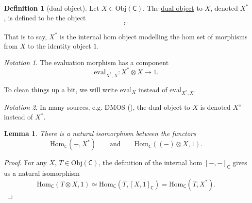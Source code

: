 \documentclass[a4paper]{report}
\newcommand{\defn}[1]{\ul{#1}}
\newcommand{\Obj}{\mathrm{Obj}}
\newcommand{\Hom}{\mathrm{Hom}}
\newcommand{\ev}{\mathrm{eval}}
\theoremstyle{definition}
\newtheorem{definition}{Definition}[section]
\theoremstyle{plain}
\newtheorem{lemma}{Lemma}[section]
\theoremstyle{remark}
\newtheorem{notation}{Notation}[section]
\begin{document}
\begin{definition}[dual object]
  \label{def:dualobject}
  Let $X \in \Obj(\mathsf{C})$. The \defn{dual object} to $X$, denoted $X^{*}$, is defined to be the object
  \begin{equation*}
    [X, 1]_{\mathsf{C}}.
  \end{equation*}

  That is to say, $X^{*}$ is the internal hom object modelling the hom set of morphisms from $X$ to the identity object $1$.
\end{definition}

\begin{notation}
  The evaluation morphism has a component
  \begin{equation*}
    \ev_{X^{*}, X}\colon X^{*} \otimes X \to 1.
  \end{equation*}

  To clean things up a bit, we will write $\ev_{X}$ instead of $\ev_{X^{*}, X}$.
\end{notation}

\begin{notation}
  In many sources, e.g. DMOS (\cite{DMOS}), the dual object to $X$ is denoted $X^{\vee}$ instead of $X^{*}$.
\end{notation}

\begin{lemma}
  There is a natural isomorphism between the functors
  \begin{equation*}
    \Hom_{\mathsf{C}}(-, X^{*})\qquad\text{and}\qquad \Hom_{\mathsf{C}}((-) \otimes X, 1).
  \end{equation*}
\end{lemma}
\begin{proof}
  For any $X$, $T \in \Obj(\mathsf{C})$, the definition of the internal hom $[-,-]_{\mathsf{C}}$ gives us a natural isomorphism
  \begin{equation*}
    \Hom_{\mathsf{C}}(T \otimes X, 1) \simeq \Hom_{\mathsf{C}}(T, [X, 1]_{\mathsf{C}}) = \Hom_{\mathsf{C}}(T, X^{*}).
  \end{equation*}
\end{proof}
\end{document}
